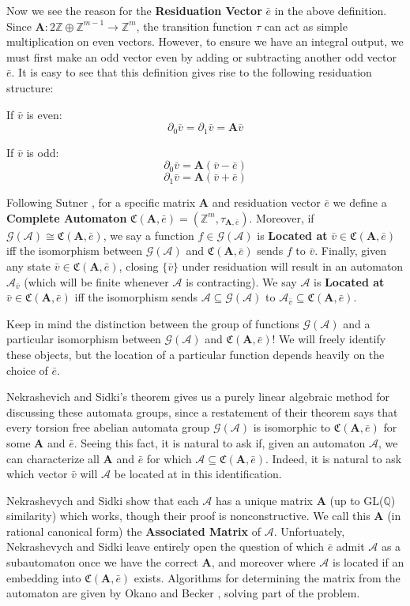 \documentclass[runningheads]{llncs}
\newcommand{\A}{\mathcal{A}}
\newcommand{\G}{\mathcal{G}}
\newcommand{\C}{\mathfrak{C}(\Am,\e)}
\newcommand{\Z}{\mathbb{Z}}
\newcommand{\Q}{\mathbb{Q}}
\newcommand{\2}{\textbf{2}}
\newcommand{\Am}{\textbf{A}}
\newcommand{\del}{\partial}
\newcommand{\vv}{\bar{v}}
\newcommand{\e}{\bar{e}}
\begin{document}
Now we see the reason for the \textbf{Residuation Vector} $\e$ in the 
above definition. Since $\Am : 2\Z \oplus \Z^{m-1} \to \Z^m$, the transition
function $\tau$ can act as simple multiplication on even vectors. However,
to ensure we have an integral output, we must first make an odd vector 
even by adding or subtracting another odd vector $\e$. It is easy to see 
that this definition gives rise to the following residuation structure:

If $\vv$ is even:
\[ \del_0 \vv = \del_1 \vv = \Am \vv \]

If $\vv$ is odd:
\[ \del_0 \vv = \Am (\vv - \e) \]
\[ \del_1 \vv = \Am (\vv + \e) \]

\noindent
Following Sutner \cite{Sutner18:abelian_automata}, for a specific matrix
$\Am$ and residuation vector $\e$ we define a \textbf{Complete Automaton} 
$\C = (\Z^m, \tau_{\Am,\e})$. Moreover, if $\G(\A) \cong \C$, we say a 
function $f \in \G(\A)$ is \textbf{Located at} $\vv \in \C$ iff the isomorphism 
between $\G(\A)$ and $\C$ sends $f$ to $\vv$. Finally, given any 
state $\vv \in \C$, closing $\{ \vv \}$ under residuation will result in an
automaton $\A_{\vv}$ (which will be finite whenever $\A$ is contracting). 
We say $\A$ is \textbf{Located at} $\vv \in \C$ iff the isomorphism sends 
$\A \subseteq \G(\A)$ to $\A_{\vv} \subseteq \C$. 

Keep in mind the distinction between the group of functions $\G(\A)$
and a particular isomorphism between $\G(\A)$ and $\C$! We will freely
identify these objects, but the location of a particular function
depends heavily on the choice of $\e$.

Nekrashevich and Sidki's theorem gives us a purely linear algebraic method
for discussing these automata groups, since a restatement of their theorem 
says that every torsion free abelian automata group $\G(\A)$ is isomorphic 
to $\C$ for some $\Am$ and $\e$. Seeing this fact, it is natural to ask if,
given an automaton $\A$, we can characterize all $\Am$ and $\e$ for which 
$\A \subseteq \C$. Indeed, it is natural to ask which vector $\vv$ will $\A$
be located at in this identification.

Nekrashevych and Sidki show that each $\A$ 
has a unique matrix $\Am$ (up to GL($\Q$) similarity) which works, though
their proof is nonconstructive. We call this $\Am$ (in rational canonical form)
the \textbf{Associated Matrix} of $\A$. Unfortuately, Nekrashevych and Sidki 
leave entirely open the question of which $\e$ admit $\A$ as a subautomaton
once we have the correct $\Am$, and moreover where $\A$ is located
if an embedding into $\C$ exists. Algorithms for determining the matrix from
the automaton are given by Okano \cite{Okano15:thesis} 
and Becker \cite{Becker18:thesis}, solving part of the problem. 
\end{document}
